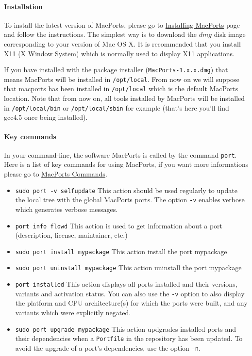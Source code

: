 \paragraph{Installation}
To install the latest version of MacPorts, please go to \href{http://www.macports.org/install.php}{Installing MacPorts} page and follow the instructions. The simplest way is to download the $dmg$ disk image corresponding to your version of Mac OS X. It is recommended that you install X11 (X Window System) which is normally used to display X11 applications.%

If you have installed with the package installer (\verb|MacPorts-1.x.x.dmg|) that means MacPorts will be installed in \verb|/opt/local|. From now on we will suppose that macports has been installed in \verb|/opt/local| which is the default MacPorts location. Note that from now on, all tools installed by MacPorts will be installed in \lstinline!/opt/local/bin! or \lstinline!/opt/local/sbin! for example (that's here you'll find gcc4.5 once being installed).%

\paragraph{Key commands}
In your command-line, the software MacPorts is called by the command \verb|port|.
Here is a list of key commands for using MacPorts, if you want more informations please go to \href{http://guide.macports.org/#using.port}{MacPorts Commands}.
\begin{itemize}
\item \verb|sudo port -v selfupdate|
	This action should be used regularly to update the local tree with the global MacPorts ports. The option \verb|-v| enables verbose which generates verbose messages.
\item \verb|port info flowd|
	This action is used to get information about a port (description, license, maintainer, etc.)
\item \verb|sudo port install mypackage|
	This action install the port mypackage
\item \verb|sudo port uninstall mypackage|
	This action uninstall the port mypackage
\item \verb|port installed|
	This action displays all ports installed and their versions, variants and activation status. You can also use the \verb|-v| option to also display the platform and CPU architecture(s) for which the ports were built, and any variants which were explicitly negated.
\item \verb|sudo port upgrade mypackage|
	This action updgrades installed ports and their dependencies when a \verb|Portfile| in the repository has been updated. To avoid the upgrade of a port's dependencies, use the option \verb|-n|.
\end{itemize}

